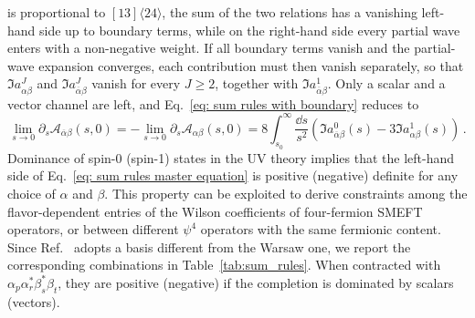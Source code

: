 is proportional to $[13]\langle 24\rangle$, the sum of the two relations has a vanishing left-hand
side up to boundary terms, while on the right-hand side every partial wave enters with a
non-negative weight. If all boundary terms vanish and the partial-wave expansion converges, each
contribution must then vanish separately, so that $\Im a_{\alpha\beta}^{J}$ and
$\Im a_{\overline\alpha\beta}^{J}$ vanish for every $J\geq2$, together with
$\Im a_{\overline\alpha\beta}^{1}$. Only a scalar and a vector channel are left, and
Eq.~\eqref{eq: sum rules with boundary} reduces to~\cite{Remmen:2020uze}
\begin{equation}\label{eq: sum rules master equation}
    \lim_{s\to 0}\partial_s\mathcal{A}_{\overline \alpha\beta}(s,0) = -\lim_{s\to 0}\partial_s\mathcal{A}_{ \alpha\beta}(s,0) =8\int_{s_0}^\infty \frac{\dd s}{s^2}\left(\Im a_{\overline{\alpha}\beta}^{0}(s)-3\Im a_{\alpha\beta}^{1}(s)\right)\,.
\end{equation}
Dominance of spin-0 (spin-1) states in the UV theory implies that the left-hand side of
Eq.~\eqref{eq: sum rules master equation} is positive (negative) definite for any choice of $\alpha$
and $\beta$. This property can be exploited to derive constraints among the flavor-dependent entries
of the Wilson coefficients of four-fermion SMEFT operators, or between different $\psi^4$ operators
with the same fermionic content. Since Ref.~\cite{Remmen:2020uze} adopts a basis different from the
Warsaw one, we report the corresponding combinations in Table~\ref{tab:sum_rules}. When contracted
with $\alpha_p \alpha_r^* \beta^*_s \beta_t$, they are positive (negative) if the completion is
dominated by scalars (vectors).
%

%


